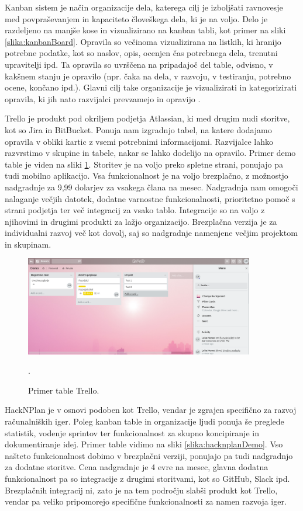\documentclass[12pt,a4paper,twoside]{book}
\begin{document}
Kanban sistem je način organizacije dela, katerega cilj je izboljšati ravnovesje med povpraševanjem in kapaciteto človeškega dela, ki je na voljo. Delo je razdeljeno na manjše kose in vizualizirano na kanban tabli, kot primer na sliki \ref{slika:kanbanBoard}. Opravila so večinoma vizualizirana na listkih, ki hranijo potrebne podatke, kot so naslov, opis, ocenjen čas potrebnega dela, trenutni upravitelji ipd. Ta opravila so uvrščena na pripadajoč del table, odvisno, v kakšnem stanju je opravilo (npr. čaka na dela, v razvoju, v testiranju, potrebno ocene, končano ipd.). Glavni cilj take organizacije je vizualizirati in kategorizirati opravila, ki jih nato razvijalci prevzamejo in opravijo \cite{kanbanBoard}.

Trello je produkt pod okriljem podjetja Atlassian, ki med drugim nudi storitve, kot so Jira in BitBucket. Ponuja nam izgradnjo tabel, na katere dodajamo opravila v obliki kartic z vsemi potrebnimi informacijami. Razvijalce lahko razvrstimo v skupine in tabele, nakar se lahko dodelijo na opravilo. Primer demo table je viden na sliki \ref{slika:trelloDemo}. Storitev je na voljo preko spletne strani, ponujajo pa tudi mobilno aplikacijo. Vsa funkcionalnost je na voljo brezplačno, z možnostjo nadgradnje za 9,99 dolarjev za vsakega člana na mesec. Nadgradnja nam omogoči nalaganje večjih datotek, dodatne varnostne funkcionalnosti, prioritetno pomoč s strani podjetja ter več integracij za vsako tablo. Integracije so na voljo z njihovimi in drugimi produkti za lažjo organizacijo. Brezplačna verzija je za individualni razvoj več kot dovolj, saj so nadgradnje namenjene večjim projektom in skupinam.

\begin{figure}[h]
	\centering
	\includegraphics[width=10cm]{trelloBoardDemo}
	\caption{Primer table Trello.}.
	\label{slika:trelloDemo}
	\vspace*{-2em}
\end{figure}

HackNPlan je v osnovi podoben kot Trello, vendar je zgrajen specifično za razvoj računalniških iger. Poleg kanban table in organizacije ljudi ponuja še preglede statistik, vodenje sprintov ter funkcionalnost za skupno koncipiranje in dokumentiranje idej. Primer table vidimo na sliki \ref{slika:hacknplanDemo}. Vso našteto funkcionalnost dobimo v brezplačni verziji, ponujajo pa tudi nadgradnjo za dodatne storitve. Cena nadgradnje je 4 evre na mesec, glavna dodatna funkcionalnost pa so integracije z drugimi storitvami, kot so GitHub, Slack ipd. Brezplačnih integracij ni, zato je na tem področju slabši produkt kot Trello, vendar pa veliko pripomorejo specifične funkcionalnosti za namen razvoja iger.
\end{document}
